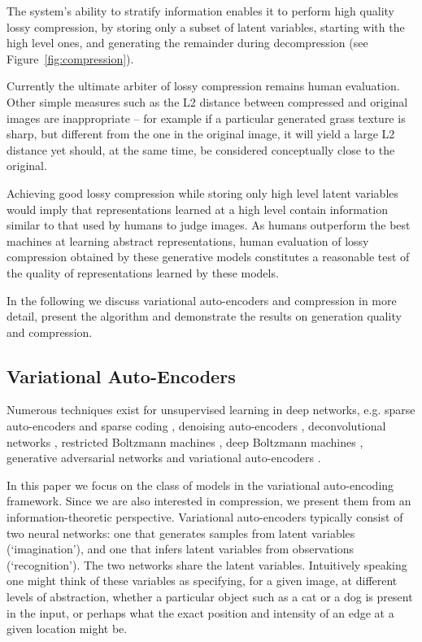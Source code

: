 \documentclass{article}
\begin{document}
The system's ability to stratify information enables it to perform high quality lossy compression, by storing only a subset of latent variables, starting with the high level ones, and generating the remainder during decompression (see Figure~\ref{fig:compression}).

Currently the ultimate arbiter of lossy compression remains human evaluation.  Other simple measures such as the L2 distance between compressed and original images are inappropriate -- for example if a particular generated grass texture is sharp, but different from the one in the original image, it will yield a large L2 distance yet should, at the same time, be considered conceptually close to the original.

Achieving good lossy compression while storing only high level latent variables would imply that representations learned at a high level contain information similar to that used by humans to judge images. As humans outperform the best machines at learning abstract representations, human evaluation of lossy compression obtained by these generative models constitutes a reasonable test of the quality of representations learned by these models.

In the following we discuss variational auto-encoders and compression in more detail, present the algorithm and demonstrate the results on generation quality and compression.

\subsection{Variational Auto-Encoders}

Numerous techniques exist for unsupervised learning in deep networks, e.g. sparse auto-encoders and sparse coding \citep{kavukcuoglu2010learning, le2013building}, denoising auto-encoders \citep{vincent2010stacked}, deconvolutional networks \citep{zeiler2010deconvolutional}, restricted Boltzmann machines \citep{hinton2006reducing}, deep Boltzmann machines \cite{salakhutdinov2009deep}, generative adversarial networks \citep{goodfellow2014generative} and variational auto-encoders \citep{kingma2013auto, rezende2014stochastic, gregor2013deep}.  

In this paper we focus on the class of models in the variational auto-encoding framework. Since we are also interested in compression, we present them from an information-theoretic perspective. Variational auto-encoders typically consist of two neural networks: one that generates samples from latent variables (`imagination'), and one that infers latent variables from observations (`recognition'). The two networks share the latent variables. Intuitively speaking one might think of these variables as specifying, for a given image, at different levels of abstraction, whether a particular object such as a cat or a dog is present in the input, or perhaps what the exact position and intensity of an edge at a given location might be.
\end{document}
